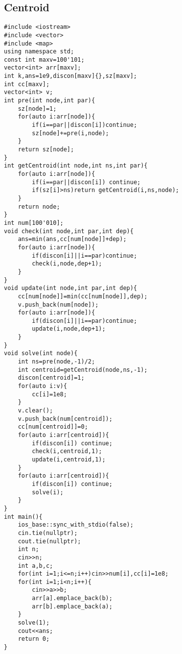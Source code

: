 \documentclass[landscape, 8pt, a4paper, oneside, twocolumn]{extarticle}
\begin{document}
\subsection {Centroid}
\begin{verbatim}
#include <iostream>
#include <vector>
#include <map>
using namespace std;
const int maxv=100'101;
vector<int> arr[maxv];
int k,ans=1e9,discon[maxv]{},sz[maxv];
int cc[maxv];
vector<int> v;
int pre(int node,int par){
    sz[node]=1;
    for(auto i:arr[node]){
        if(i==par||discon[i])continue;
        sz[node]+=pre(i,node);
    }
    return sz[node];
}
int getCentroid(int node,int ns,int par){
    for(auto i:arr[node]){
        if(i==par||discon[i]) continue;
        if(sz[i]>ns)return getCentroid(i,ns,node);
    }
    return node;
}
int num[100'010];
void check(int node,int par,int dep){
    ans=min(ans,cc[num[node]]+dep);
    for(auto i:arr[node]){
        if(discon[i]||i==par)continue;
        check(i,node,dep+1);
    }
}
void update(int node,int par,int dep){
    cc[num[node]]=min(cc[num[node]],dep);
    v.push_back(num[node]);
    for(auto i:arr[node]){
        if(discon[i]||i==par)continue;
        update(i,node,dep+1);
    }
}
void solve(int node){
    int ns=pre(node,-1)/2;
    int centroid=getCentroid(node,ns,-1);
    discon[centroid]=1;
    for(auto i:v){
        cc[i]=1e8;
    }
    v.clear();
    v.push_back(num[centroid]);
    cc[num[centroid]]=0;
    for(auto i:arr[centroid]){
        if(discon[i]) continue;
        check(i,centroid,1);
        update(i,centroid,1);
    }
    for(auto i:arr[centroid]){
        if(discon[i]) continue;
        solve(i);
    }
}
int main(){
    ios_base::sync_with_stdio(false);
    cin.tie(nullptr);
    cout.tie(nullptr);
    int n;
    cin>>n;
    int a,b,c;
    for(int i=1;i<=n;i++)cin>>num[i],cc[i]=1e8;
    for(int i=1;i<n;i++){
        cin>>a>>b;
        arr[a].emplace_back(b);
        arr[b].emplace_back(a);
    }
    solve(1);
    cout<<ans;
    return 0;
}
\end{verbatim}
\end{document}
